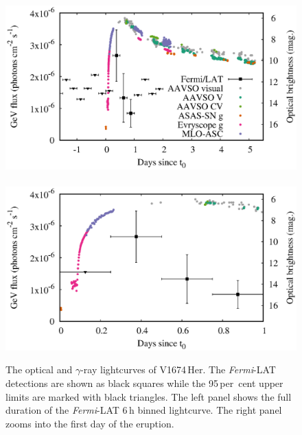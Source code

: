 \documentclass[a4paper,fleqn,usenatbib]{mnras}
\newcommand{\nova}{V1674\,Her}
\newcommand{\fermilat}{\emph{Fermi}-LAT}
\begin{document}
\begin{figure}
        \includegraphics[width=0.48\linewidth,clip=true,trim=0.15cm 0.5cm 0.8cm 0.2cm,angle=0]{lightcurve_visual_lat.eps}~~~~
        \includegraphics[width=0.48\linewidth,clip=true,trim=0.15cm 0.5cm 0.8cm 0.2cm,angle=0]{lightcurve_visual_lat_zoom.eps}
\caption{The optical and $\gamma$-ray lightcurves of \nova{}.
The \fermilat{} detections %
are shown as black squares while the 95\,per~cent upper limits are marked with black triangles.
The left panel shows the full duration of the \fermilat{} 6\,h binned lightcurve.
The right panel zooms into the first day of the eruption.}
    \label{fig:latlc}
\end{figure}
\end{document}
